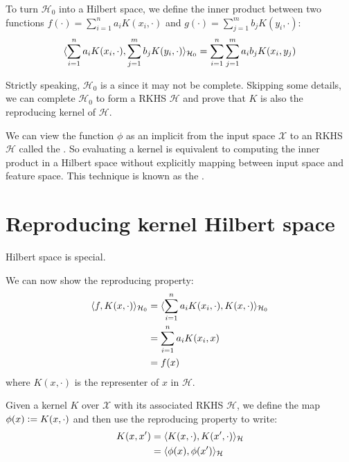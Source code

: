 To turn $\mathcal{H}_0$ into a Hilbert space, we define the inner product between two functions $f(\cdot) = \sum_{i=1}^n a_i K(x_i, \cdot)$ and $g(\cdot) = \sum_{j=1}^m b_j K(y_i, \cdot)$:
%
\begin{equation}
  \langle\sum_{i=1}^n a_i K(x_i, \cdot), \sum_{j=1}^m b_j K(y_i, \cdot)\rangle_{\mathcal{H}_0} = \sum_{i=1}^n \sum_{j=1}^m a_i b_j K(x_i, y_j)
\end{equation}

Strictly speaking, $\mathcal{H}_0$ is a  since it may not be complete. Skipping some details, we can complete $\mathcal{H}_0$ to form a RKHS $\mathcal{H}$ and prove that $K$ is also the reproducing kernel of $\mathcal{H}$.




We can view the function $\phi$ as an implicit  from the input space $\mathcal{X}$ to an RKHS $\mathcal{H}$ called the . So evaluating a kernel is equivalent to computing the inner product in a Hilbert space without explicitly mapping between input space and feature space. This technique is known as the .

\section{Reproducing kernel Hilbert space}
Hilbert space is special.

We can now show the reproducing property:
%
\begin{align}
  \langle f, K(x, \cdot)\rangle_{\mathcal{H}_0} &= \langle\sum_{i=1}^n a_i K(x_i, \cdot), K(x, \cdot)\rangle_{\mathcal{H}_0} \\
                             &= \sum_{i=1}^n a_i K(x_i, x) \\
                             &= f(x)
\end{align}
%
where $K(x, \cdot)$ is the representer of $x$ in $\mathcal{H}$.

Given a kernel $K$ over $\mathcal{X}$ with its associated RKHS $\mathcal{H}$, we define the map $\phi(x) \vcentcolon= K(x, \cdot)$ and then use the reproducing property to write:
\begin{align}
  K(x, x^\prime) &= \langle K(x, \cdot), K(x^\prime, \cdot)\rangle_\mathcal{H} \\
                                   &= \langle\phi(x), \phi(x^\prime)\rangle_\mathcal{H}
\end{align}



